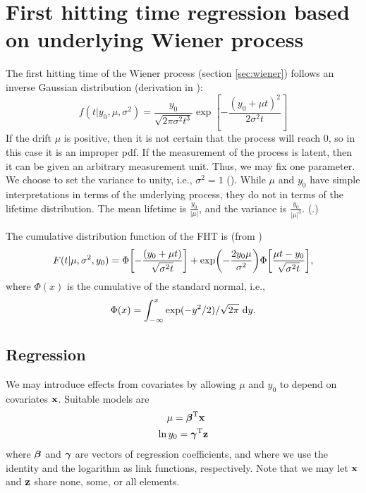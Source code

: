 \section{First hitting time regression based on underlying Wiener process}
The first hitting time of the Wiener process (section \ref{sec:wiener}) follows an inverse Gaussian distribution (derivation in \cite[23-29]{chhikara1988}):
\begin{equation}
\label{eq:fht-ig}
    f(t|y_0,\mu,\sigma^2)=\frac{y_0}{\sqrt{2\pi\sigma^2t^3}}\exp\left[-\frac{(y_0+\mu t)^2}{2\sigma^2t}\right]
\end{equation}
If the drift $\mu$ is positive, then it is not certain that the process will reach 0, so in this case it is an improper pdf. If the measurement of the process is latent, then it can be given an arbitrary measurement unit. Thus, we may fix one parameter. We choose to set the variance to unity, i.e., $\sigma^2=1$ (\cite{leewhitmore2006}). While $\mu$ and $y_0$ have simple interpretations in terms of the underlying process, they do not in terms of the lifetime distribution. The mean lifetime is $\frac{y_0}{|\mu|}$, and the variance is $\frac{y_0}{|\mu|^3}$. (\cite[62]{caroni2017}.)

The cumulative distribution function of the FHT is (from \cite[7]{threg})
\begin{equation}\label{eq:cumulative}
    F(t|\mu,\sigma^2,y_0)=\Phi\sqb*{-\frac{(y_0+\mu t)}{\sqrt{\sigma^2t}}}+\exp\p*{-\frac{2y_0\mu}{\sigma^2}}\Phi\sqb*{\frac{\mu t-y_0}{\sqrt{\sigma^2t}}},
\end{equation}
where $\Phi(x)$ is the cumulative of the standard normal, i.e.,
\begin{equation}
    \Phi(x)=\int_{-\infty}^x\exp(-y^2/2)/\sqrt{2\pi}\text{~d}y.
\end{equation}

\subsection{Regression}
We may introduce effects from covariates by allowing $\mu$ and $y_0$ to depend on covariates $\mathbf{x}$. Suitable models are
\begin{align}\label{eq:coeffs}
\begin{split}
    \mu=\bbeta^\T\x \\
    \ln y_0=\bgamma^\T\z
\end{split}
\end{align}
where $\boldsymbol{\beta}$ and $\boldsymbol{\gamma}$ are vectors of regression coefficients, and where we use the identity and the logarithm as link functions, respectively. Note that we may let $\mathbf{x}$ and $\mathbf{z}$ share none, some, or all elements.

